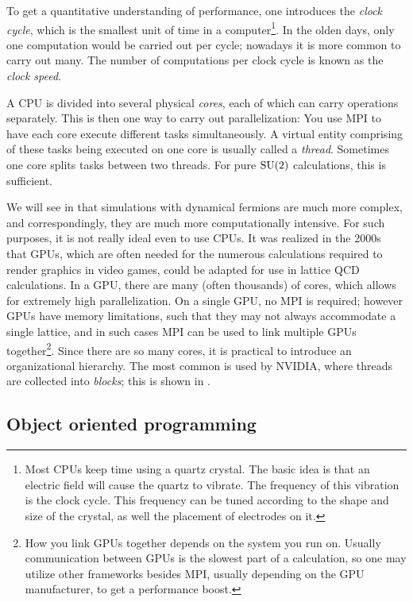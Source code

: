 To get a quantitative understanding of performance, one introduces
the {\it clock cycle}, which is the smallest unit of
time in a computer\footnote{Most CPUs keep time using a quartz crystal.
The basic idea is that an electric field will cause the quartz to
vibrate. The frequency of this vibration is the clock cycle.
This frequency can be tuned according to the shape and size of the
crystal, as well the placement of electrodes on it.}.
In the olden days, only one computation would be carried out per cycle;
nowadays it is more common to carry out many. The number of
computations per clock cycle is known as the {\it clock speed}.

A CPU is divided into several physical {\it cores}, each of which can
carry operations separately. This is then one way to carry out parallelization:
You use MPI to have each core execute different tasks simultaneously.
A virtual entity comprising of these tasks being executed on one core
is usually called a {\it thread}. Sometimes one core splits
tasks between two threads. For pure $\operatorname{SU}(2)$ calculations, this
is sufficient.


We will see in  that simulations with dynamical fermions
are much more complex, and correspondingly, they are much more
computationally intensive. For such purposes, it is not really ideal even
to use CPUs. It was realized in the 2000s~\cite{egri_lattice_2007}
that GPUs, which
are often needed for the numerous calculations required to render graphics
in video games, could be adapted for use in lattice QCD calculations.
In a GPU, there are many (often thousands) of cores, which allows for
extremely high parallelization. On a single GPU, no MPI is required;
however GPUs have memory limitations, such that they may not always accommodate
a single lattice, and in such cases MPI can be used to link
multiple GPUs together\footnote{How you link GPUs together depends on the
system you run on. Usually communication between GPUs is the slowest part
of a calculation, so one may utilize other frameworks besides MPI, usually
depending on the GPU manufacturer, to get a performance boost.}.
Since there are so many cores, it is practical to introduce an organizational
hierarchy. The most common is used by NVIDIA, where threads are collected
into {\it blocks}; this is shown in .

\subsection{Object oriented programming}


